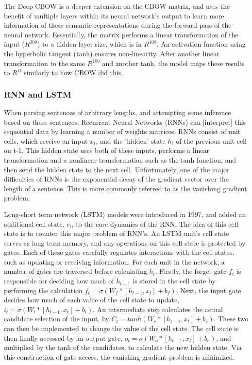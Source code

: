 The Deep CBOW is a deeper extension on the CBOW matrix, and uses the benefit of
multiple layers within its neural network's output to learn more information of
these semantic representations during the forward pass of the neural network.
Essentially, the matrix performs a linear transformation of the input ($R^{300}$)
to a hidden layer size, which is in $R^{100}$. An activation function using the
hyperbolic tangent (tanh) ensures non-linearity. After another linear
transformation to the same $R^{100}$ and another tanh, the model maps these
results to $R^D$ similarly to how CBOW did this. 


\subsubsection{RNN and LSTM}
When parsing sentences of arbitrary lengths, and attempting some inference based
on these sentences, Recurrent Neural Networks (RNNs) can [interpret] this
sequential data by learning a number of weights matrices. RNNs consist of unit
cells, which receive an input $x_t$, and the 'hidden' state $h_t$ of the
previous unit cell on t-1. This hidden state uses both of these inputs, performs
a linear transformation and a nonlinear transformation such as the tanh
function, and then send the hidden state to the next cell. Unfortunately, one of
the major difficulties of RNNs is the exponential decay of the gradient vector
over the length of a sentence\cite{bengio1994learning}. This is more commonly
referred to as the vanishing gradient problem.

Long-short term network (LSTM) models \cite{hochreiter1997long} were introduced
in 1997, and added an additional cell state, $c_t$, to the core dynamics of the
RNN. The idea of this cell-state is to counter this major problem of RNN's. An
LSTM unit's cell state serves as long-term memory, and any operations on this
cell state is protected by gates. Each of these gates carefully regulates
interactions with the cell states, such as updating or receiving information.
For each unit in the network, a number of gates are traversed before calculating
$h_t$. Firstly, the forget gate $f_t$ is responsible for deciding how much of
$h_{t-1}$ is stored in the cell state by performing the calculation $f_t =
\sigma(W_f * [h_{t-1}, x_t] + b_f)$. Next, the input gate decides how much of
each value of the cell state to update, $i_t = \sigma(W_i * [h_{t-1}, x_t] +
b_i)$. An intermediate step calculates the actual candidate selection of the
input, by $C_t = tanh(W_c * [h_{t-1}, x_t] + b_c)$. These two can then be
implemented to change the value of the cell state. The cell state is then
finally accessed by an output gate, $o_t = \sigma(W_o * [h_{t-1}, x_t] + b_o)$,
and multiplied by the tanh of the candidates, to calculate the new hidden state.
Via this construction of gate access, the vanishing gradient problem is
minimized.
